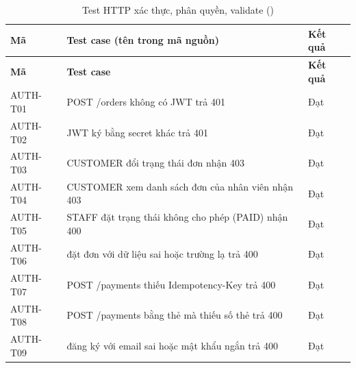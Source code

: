 {\small
\begin{longtable}{@{}L{1.9cm}L{10.6cm}L{1.3cm}@{}}
\caption{Test HTTP xác thực, phân quyền, validate ()}\label{tab:autht}\\
\toprule
\textbf{Mã} & \textbf{Test case (tên trong mã nguồn)} & \textbf{Kết quả} \\ \midrule \endfirsthead
\toprule \textbf{Mã} & \textbf{Test case} & \textbf{Kết quả} \\ \midrule \endhead
\bottomrule \endfoot
AUTH-T01 & POST /orders không có JWT trả 401 & Đạt \\
AUTH-T02 & JWT ký bằng secret khác trả 401 & Đạt \\
AUTH-T03 & CUSTOMER đổi trạng thái đơn nhận 403 & Đạt \\
AUTH-T04 & CUSTOMER xem danh sách đơn của nhân viên nhận 403 & Đạt \\
AUTH-T05 & STAFF đặt trạng thái không cho phép (PAID) nhận 400 & Đạt \\
AUTH-T06 & đặt đơn với dữ liệu sai hoặc trường lạ trả 400 & Đạt \\
AUTH-T07 & POST /payments thiếu Idempotency-Key trả 400 & Đạt \\
AUTH-T08 & POST /payments bằng thẻ mà thiếu số thẻ trả 400 & Đạt \\
AUTH-T09 & đăng ký với email sai hoặc mật khẩu ngắn trả 400 & Đạt \\
\end{longtable}
}